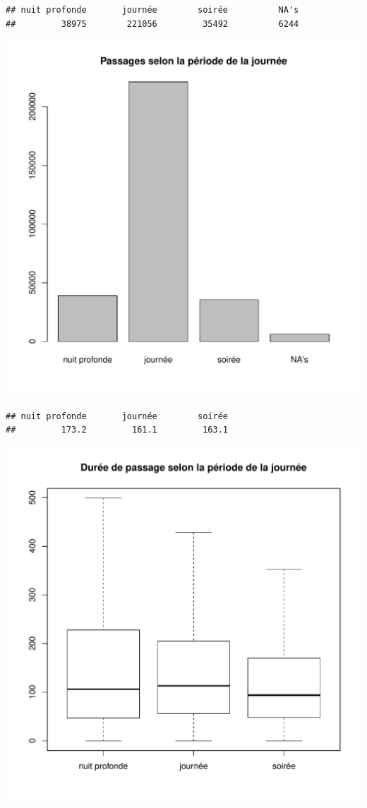 \documentclass[12pt,english,french,twoside]{report}\usepackage[]{graphicx}\usepackage[]{color}
\makeatletter
\def\maxwidth{ %
  \ifdim\Gin@nat@width>\linewidth
    \linewidth
  \else
    \Gin@nat@width
  \fi
}
\newenvironment{kframe}{%
 \def\at@end@of@kframe{}%
 \ifinner\ifhmode%
  \def\at@end@of@kframe{\end{minipage}}%
  \begin{minipage}{\columnwidth}%
 \fi\fi%
 \def\FrameCommand##1{\hskip\@totalleftmargin \hskip-\fboxsep
 \colorbox{shadecolor}{##1}\hskip-\fboxsep
     \hskip-\linewidth \hskip-\@totalleftmargin \hskip\columnwidth}%
 \MakeFramed {\advance\hsize-\width
   \@totalleftmargin\z@ \linewidth\hsize
   \@setminipage}}%
 {\par\unskip\endMakeFramed%
 \at@end@of@kframe}
\newenvironment{knitrout}{}{} %
\makeatother
\begin{document}
\begin{knitrout}
\color{fgcolor}\begin{kframe}
\begin{verbatim}
## nuit profonde       journée        soirée          NA's 
##         38975        221056         35492          6244
\end{verbatim}
\end{kframe}
\includegraphics[width=\maxwidth]{figure/duree_heure1} 
\begin{kframe}\begin{verbatim}
## nuit profonde       journée        soirée 
##         173.2         161.1         163.1
\end{verbatim}
\end{kframe}
\includegraphics[width=\maxwidth]{figure/duree_heure2} 

\end{knitrout}
\end{document}
